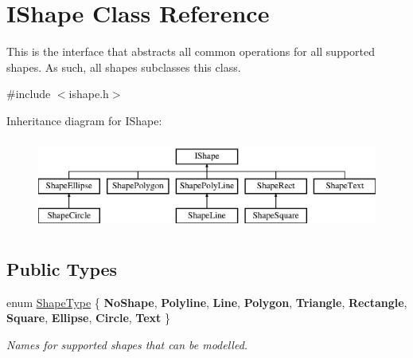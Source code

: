 \hypertarget{class_i_shape}{}\section{I\+Shape Class Reference}
\label{class_i_shape}


This is the interface that abstracts all common operations for all supported shapes. As such, all shapes subclasses this class.  




{\ttfamily \#include $<$ishape.\+h$>$}

Inheritance diagram for I\+Shape\+:\begin{figure}[H]
\begin{center}
\leavevmode
\includegraphics[height=3.000000cm]{class_i_shape}
\end{center}
\end{figure}
\subsection*{Public Types}
\begin{DoxyCompactItemize}
\item 
enum \mbox{\hyperlink{class_i_shape_a8f50993477b5ddb44c0547ef3d547cdc}{Shape\+Type}} \{ \newline
{\bfseries No\+Shape}, 
{\bfseries Polyline}, 
{\bfseries Line}, 
{\bfseries Polygon}, 
\newline
{\bfseries Triangle}, 
{\bfseries Rectangle}, 
{\bfseries Square}, 
{\bfseries Ellipse}, 
\newline
{\bfseries Circle}, 
{\bfseries Text}
 \}
\begin{DoxyCompactList}\small\item\em Names for supported shapes that can be modelled. \end{DoxyCompactList}\end{DoxyCompactItemize}
